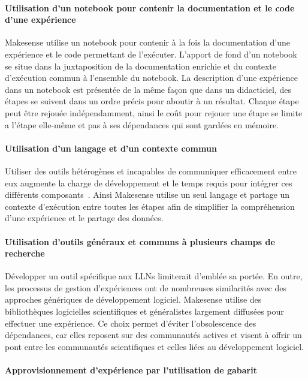 \paragraph{Utilisation d'un notebook pour contenir la documentation et le code d'une expérience}

Makesense utilise un notebook pour contenir à la fois la documentation d'une expérience et le code permettant de l'exécuter.
L'apport de fond d'un notebook se situe dans la juxtaposition de la documentation enrichie et du contexte d'exécution commun à l'ensemble du notebook.
La description d'une expérience dans un notebook est présentée de la même façon que dans un didacticiel, des étapes se suivent dans un ordre précis pour aboutir à un résultat.
Chaque étape peut être rejouée indépendamment, ainsi le coût pour rejouer une étape se limite a l'étape elle-même et pas à ses dépendances qui sont gardées en mémoire.

\paragraph{Utilisation d'un langage et d'un contexte commun}

Utiliser des outils hétérogènes et incapables de communiquer efficacement entre eux augmente la charge de développement et le temps requis pour intégrer ces différents composants~\cite{stanisic2015effective}.
Ainsi Makesense utilise un seul langage et partage un contexte d'exécution entre toutes les étapes afin de simplifier la compréhension d'une expérience et le partage des données.

\paragraph{Utilisation d'outils généraux et communs à plusieurs champs de recherche}

Développer un outil spécifique aux \ac{LLN}s limiterait d'emblée sa portée.
En outre, les processus de gestion d'expériences ont de nombreuses similarités avec des approches génériques de développement logiciel.
Makesense utilise des bibliothèques logicielles scientifiques et généralistes largement diffusées pour effectuer une expérience.
Ce choix permet d'éviter l'obsolescence des dépendances, car elles reposent sur des communautés actives et visent à offrir un pont entre les communautés scientifiques et celles liées au développement logiciel.

\paragraph{Approvisionnement d'expérience par l'utilisation de gabarit}

